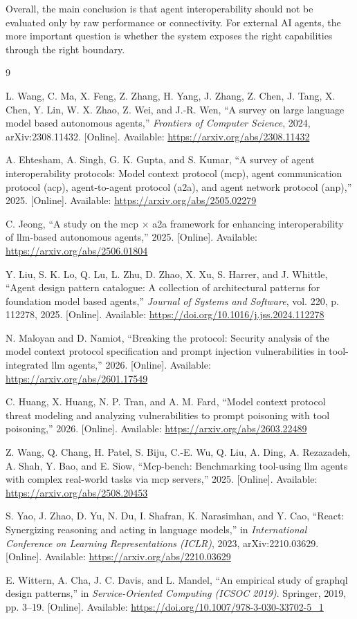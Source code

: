 \documentclass[conference]{IEEEtran}
\begin{document}
Overall, the main conclusion is that agent interoperability should not be
evaluated only by raw performance or connectivity. For external AI agents,
the more important question is whether the system exposes the right
capabilities through the right boundary.

\begin{thebibliography}{9}

L. Wang, C. Ma, X. Feng, Z. Zhang, H. Yang, J. Zhang, Z. Chen, J. Tang, X.
Chen, Y. Lin, W. X. Zhao, Z. Wei, and J.-R. Wen, ``A survey on large language
model based autonomous agents,'' \emph{Frontiers of Computer Science}, 2024,
arXiv:2308.11432. [Online]. Available: \url{https://arxiv.org/abs/2308.11432}

A. Ehtesham, A. Singh, G. K. Gupta, and S. Kumar, ``A survey of agent
interoperability protocols: Model context protocol (mcp), agent
communication protocol (acp), agent-to-agent protocol (a2a), and agent
network protocol (anp),'' 2025. [Online]. Available:
\url{https://arxiv.org/abs/2505.02279}

C. Jeong, ``A study on the mcp $\times$ a2a framework for enhancing
interoperability of llm-based autonomous agents,'' 2025. [Online]. Available:
\url{https://arxiv.org/abs/2506.01804}

Y. Liu, S. K. Lo, Q. Lu, L. Zhu, D. Zhao, X. Xu, S. Harrer, and J. Whittle,
``Agent design pattern catalogue: A collection of architectural patterns for
foundation model based agents,'' \emph{Journal of Systems and Software}, vol.
220, p. 112278, 2025. [Online]. Available:
\url{https://doi.org/10.1016/j.jss.2024.112278}

N. Maloyan and D. Namiot, ``Breaking the protocol: Security analysis of the
model context protocol specification and prompt injection vulnerabilities in
tool-integrated llm agents,'' 2026. [Online]. Available:
\url{https://arxiv.org/abs/2601.17549}

C. Huang, X. Huang, N. P. Tran, and A. M. Fard, ``Model context protocol
threat modeling and analyzing vulnerabilities to prompt poisoning with tool
poisoning,'' 2026. [Online]. Available: \url{https://arxiv.org/abs/2603.22489}

Z. Wang, Q. Chang, H. Patel, S. Biju, C.-E. Wu, Q. Liu, A. Ding, A.
Rezazadeh, A. Shah, Y. Bao, and E. Siow, ``Mcp-bench: Benchmarking
tool-using llm agents with complex real-world tasks via mcp servers,'' 2025.
[Online]. Available: \url{https://arxiv.org/abs/2508.20453}

S. Yao, J. Zhao, D. Yu, N. Du, I. Shafran, K. Narasimhan, and Y. Cao,
``React: Synergizing reasoning and acting in language models,'' in
\emph{International Conference on Learning Representations (ICLR)}, 2023,
arXiv:2210.03629. [Online]. Available: \url{https://arxiv.org/abs/2210.03629}

E. Wittern, A. Cha, J. C. Davis, and L. Mandel, ``An empirical study of
graphql design patterns,'' in \emph{Service-Oriented Computing (ICSOC 2019)}.
Springer, 2019, pp. 3--19. [Online]. Available:
\url{https://doi.org/10.1007/978-3-030-33702-5_1}

\end{thebibliography}
\end{document}
